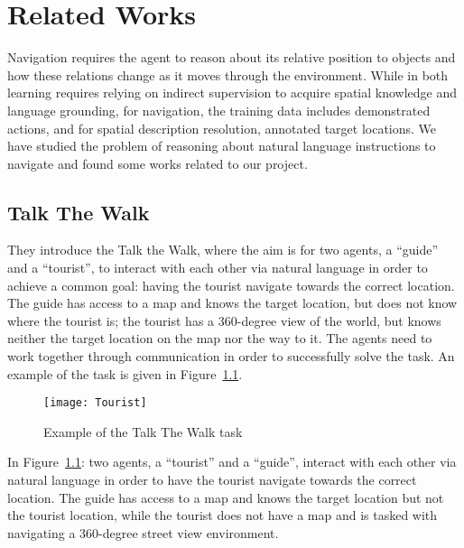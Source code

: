 \chapter{Related Works}
Navigation requires the agent to reason about its relative position to objects and how these relations change as it moves through the environment. While in both learning requires relying on indirect supervision to acquire spatial knowledge and language grounding, for navigation, the training data includes demonstrated actions, and for spatial description resolution, annotated target locations. We have studied the problem of reasoning about natural language instructions to navigate and found some works related to our project.

\section{Talk The Walk~\cite{DBLP:journals/corr/abs-1807-03367}}
They introduce the Talk the Walk, where the aim is for two agents, a “guide” and a “tourist”, to interact with each other via natural language in order to achieve a common goal: having the tourist navigate towards the correct location. The guide has access to a map and knows the target location, but does not know where the tourist is; the tourist has a 360-degree view of the world, but knows neither the target location on the map nor the way to it. The agents need to work together through communication in order to successfully solve the task. An example of the task is given in Figure~\ref{fig:3}. 

\begin{figure}[htbp]
    \centering
    \texttt{[image: Tourist]}
    \caption{ Example of the Talk The Walk task~\cite{DBLP:journals/corr/abs-1807-03367}}
    \label{fig:3}
\end{figure}
In Figure~\ref{fig:3}:  two agents, a “tourist” and a “guide”, interact with each other via natural language in order to have the tourist navigate towards the correct location. The guide has access to a map and knows the target location but not the tourist location, while the tourist does not have a map and is tasked with navigating a 360-degree street view environment. 
